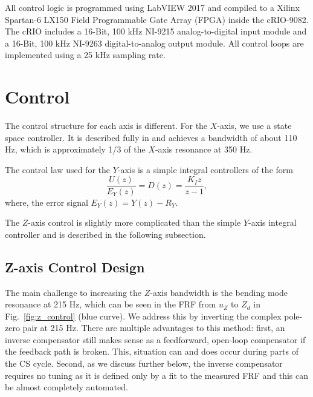 \documentclass[twocolumn,twoside]{IEEEtran/IEEEtran}
\begin{document}
	
All control logic is programmed using LabVIEW 2017 and compiled to a Xilinx
Spartan-6 LX150 Field Programmable Gate Array (FPGA) inside the cRIO-9082. The
cRIO includes a 16-Bit, 100 kHz NI-9215 analog-to-digital input module and a
16-Bit, 100 kHz NI-9263 digital-to-analog output module. All control loops are
implemented using a 25 kHz sampling rate.

\section{Control}\label{sec:control}
The control structure for each axis is different. For the $X$-axis, we use a
state space controller. It is described fully in \cite{braker_afmmpc_2019} and
achieves a bandwidth of about 110 Hz, which is approximately 1/3 of the $X$-axis
resonance at 350 Hz.

The control law used for the $Y$-axis is a simple integral controllers of the
form
\begin{equation}
  \frac{U(z)}{E_Y(z)}=D(z) = \frac{K_Iz}{z-1},
  \label{eqn:dzI}
\end{equation}
where, the error signal $E_Y(z) = Y(z)-R_Y$.


The $Z$-axis control is slightly more complicated than the simple $Y$-axis
integral controller and is described in the following subsection.
\subsection{Z-axis Control Design}\label{sec:zaxis_cs_control}
The main challenge to increasing the $Z$-axis bandwidth is the bending mode
resonance at 215 Hz, which can be seen in the FRF from $u_Z$ to $Z_{d}$ in
Fig.~\ref{fig:z_control} (blue curve). We address this by inverting the complex
pole-zero pair at 215 Hz. There are multiple advantages to this method: first,
an inverse compensator still makes sense as a feedforward, open-loop compensator
if the feedback path is broken. This, situation can and does occur during parts
of the CS cycle. Second, as we discuss further below, the inverse compensator
requires no tuning as it is defined only by a fit to the measured FRF and this
can be almost completely automated.
\end{document}

